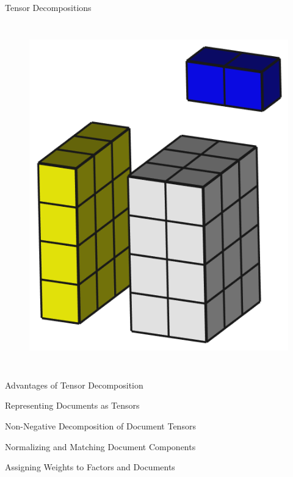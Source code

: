 \documentclass[handout]{beamer}
\begin{document}
\begin{frame}{Tensor Decompositions}
\begin{columns}
\begin{figure}
{    \includegraphics[height=0.25\textheight]{diagrams/mode12_tns_mode3}
  }
\end{figure}
\end{columns}
\end{frame}


\begin{frame}{Advantages of Tensor Decomposition}

\end{frame}


\begin{frame}{Representing Documents as Tensors}

\end{frame}


\begin{frame}{Non-Negative Decomposition of Document Tensors}

\end{frame}


\begin{frame}{Normalizing and Matching Document Components}

\end{frame}


\begin{frame}{Assigning Weights to Factors and Documents}

\end{frame}
\end{document}
